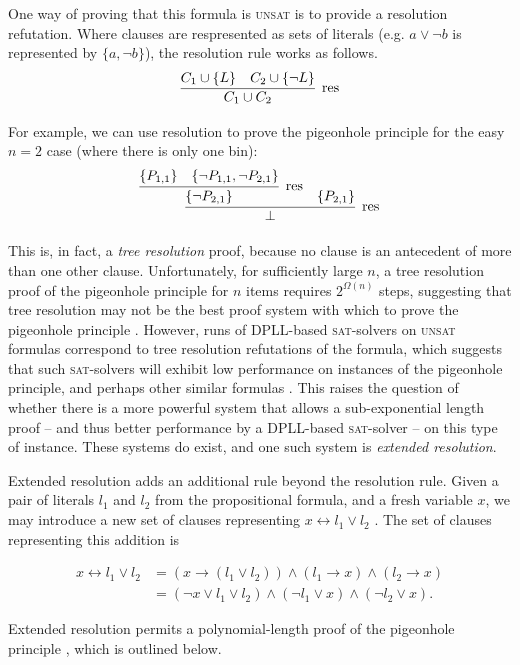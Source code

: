 \documentclass[proof,pdftex,11pt,a4,titlepage]{article}
\newcommand{\sat}{\textsc{sat}}
\newcommand{\unsat}{\textsc{unsat}}
\begin{document}
One way of proving that this formula is \unsat{} is to provide a resolution refutation. Where clauses are respresented as sets of literals (e.g. $a \vee \neg b$ is represented by $\{a, \neg b\}$), the resolution rule works as follows.\[
\infer[\mathrm{res}]{C_1 \cup C_2}{
  C_1 \cup \{L\}
  &
  C_2 \cup \{\neg L\}
}
\]

For example, we can use resolution to prove the pigeonhole principle for the easy $n = 2$ case (where there is only one bin):\[
\infer[\mathrm{res}]{\bot}{
  \infer[\mathrm{res}]{\{\neg P_{2,1}\}}{
    \{P_{1,1}\}
    &
    \{\neg P_{1,1}, \neg P_{2,1}\}
  }
  &
  \{P_{2,1}\}
}
\]

This is, in fact, a \emph{tree resolution} proof, because no clause is an antecedent of more than one other clause. Unfortunately, for sufficiently large $n$, a tree resolution proof of the pigeonhole principle for $n$ items requires $2^{\Omega(n)}$ steps, suggesting that tree resolution may not be the best proof system with which to prove the pigeonhole principle \cite{Haken:1985}.
However, runs of DPLL-based \sat{}-solvers on \unsat{} formulas correspond to tree resolution refutations of the formula, which suggests that such \sat{}-solvers will exhibit low performance on instances of the pigeonhole principle, and perhaps other similar formulas \cite{Rossi:2006}. This raises the question of whether there is a more powerful system that allows a sub-exponential length proof -- and thus better performance by a DPLL-based \sat{}-solver -- on this type of instance. These systems do exist, and one such system is \emph{extended resolution}.

Extended resolution adds an additional rule beyond the resolution rule. Given a pair of literals $l_1$ and $l_2$ from the propositional formula, and a fresh variable $x$, we may introduce a new set of clauses representing $x \leftrightarrow l_1 \vee l_2$ \cite{Tseitin:1983}. The set of clauses representing this addition is

\begin{equation*}
  \begin{align*}
    x \leftrightarrow l_1 \vee l_2 &= (x \to (l_1 \vee l_2)) \wedge (l_1 \to x) \wedge (l_2 \to x) \\
          &= (\neg x \vee l_1 \vee l_2) \wedge (\neg l_1 \vee x) \wedge (\neg l_2 \vee x).
  \end{align*}
\end{equation*}

Extended resolution permits a polynomial-length proof of the pigeonhole principle \cite{Cook:1976}, which is outlined below.
\end{document}
